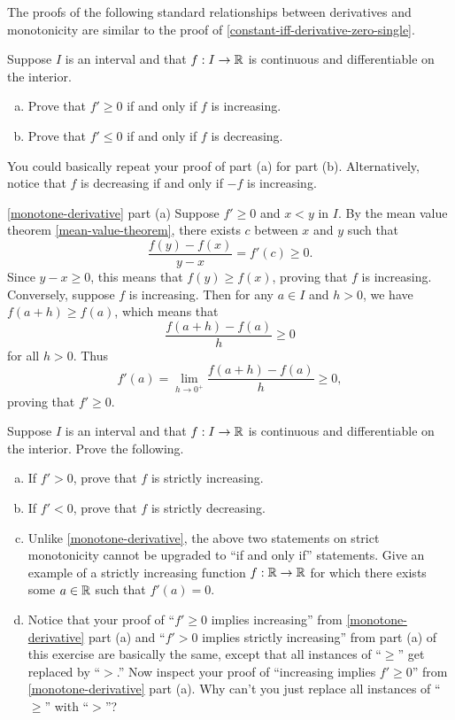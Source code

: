 The proofs of the following standard relationships between derivatives and monotonicity are similar to the proof of \cref{constant-iff-derivative-zero-single}.

\begin{exercise} \label{monotone-derivative}
	Suppose $I$ is an interval and that $f : I \to \mathbb{R}$ is continuous and differentiable on the interior. 
	\begin{enumerate}[(a)]
		\item Prove that $f' \geq 0$ if and only if $f$ is increasing. 
		\item Prove that $f' \leq 0$ if and only if $f$ is decreasing.
	\end{enumerate}
	\begin{hint}
		You could basically repeat your proof of part (a) for part (b). Alternatively, notice that $f$ is decreasing if and only if $-f$ is increasing. 
	\end{hint}
\end{exercise}

\begin{solution}{\cref{monotone-derivative} part (a)}
	Suppose $f' \geq 0$ and $x < y$ in $I$. By the mean value theorem \ref{mean-value-theorem}, there exists $c$ between $x$ and $y$ such that 
	\[ \frac{f(y)-f(x)}{y-x} = f'(c) \geq 0. \]
	Since $y - x \geq 0$, this means that $f(y) \geq f(x)$, proving that $f$ is increasing. Conversely, suppose $f$ is increasing. Then for any $a \in I$ and $h > 0$, we have $f(a+h) \geq f(a)$, which means that 
	\[ \frac{f(a+h)-f(a)}{h} \geq 0 \]
	for all $h > 0$. Thus 
	\[ f'(a) = \lim_{h \to 0^+} \frac{f(a+h)-f(a)}{h} \geq 0, \]
	proving that $f' \geq 0$. 
\end{solution}

\begin{exercise} \label{strictly-monotone-derivative}
	Suppose $I$ is an interval and that $f : I \to \mathbb{R}$ is continuous and differentiable on the interior. Prove the following. 
	\begin{enumerate}[(a)]
		\item If $f' > 0$, prove that $f$ is strictly increasing. 
		\item If $f' < 0$, prove that $f$ is strictly decreasing. 
		\item Unlike \cref{monotone-derivative}, the above two statements on strict monotonicity cannot be upgraded to ``if and only if'' statements. Give an example of a strictly increasing function $f : \mathbb{R} \to \mathbb{R}$ for which there exists some $a \in \mathbb{R}$ such that $f'(a) = 0$. 
		\item Notice that your proof of ``$f' \geq 0$ implies increasing'' from \cref{monotone-derivative} part (a) and ``$f' > 0$ implies strictly increasing'' from part (a) of this exercise are basically the same, except that all instances of ``$\geq$'' get replaced by ``$>$.'' Now inspect your proof of ``increasing implies $f' \geq 0$'' from \cref{monotone-derivative} part (a). Why can't you just replace all instances of ``$\geq$'' with ``$>$''?
	\end{enumerate} 
\end{exercise}

